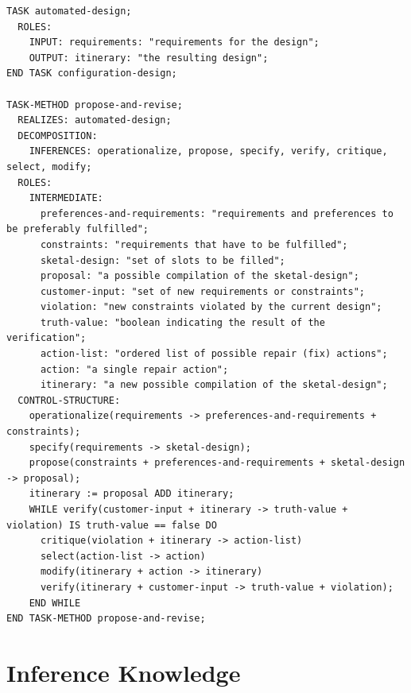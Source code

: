 \documentclass[11pt]{article} %
\begin{document}
\begin{lstlisting}[label=Task,caption=Task and task method description,breaklines=true]
TASK automated-design;
  ROLES:
    INPUT: requirements: "requirements for the design";
    OUTPUT: itinerary: "the resulting design";
END TASK configuration-design;

TASK-METHOD propose-and-revise;
  REALIZES: automated-design;
  DECOMPOSITION:
    INFERENCES: operationalize, propose, specify, verify, critique, select, modify;
  ROLES:
    INTERMEDIATE:
      preferences-and-requirements: "requirements and preferences to be preferably fulfilled";
      constraints: "requirements that have to be fulfilled";
      sketal-design: "set of slots to be filled";
      proposal: "a possible compilation of the sketal-design";
      customer-input: "set of new requirements or constraints";
      violation: "new constraints violated by the current design";
      truth-value: "boolean indicating the result of the verification";
      action-list: "ordered list of possible repair (fix) actions";
      action: "a single repair action";
      itinerary: "a new possible compilation of the sketal-design";
  CONTROL-STRUCTURE:
    operationalize(requirements -> preferences-and-requirements + constraints);
    specify(requirements -> sketal-design);
    propose(constraints + preferences-and-requirements + sketal-design -> proposal);
    itinerary := proposal ADD itinerary;
    WHILE verify(customer-input + itinerary -> truth-value + violation) IS truth-value == false DO
      critique(violation + itinerary -> action-list)
      select(action-list -> action)
      modify(itinerary + action -> itinerary)
      verify(itinerary + customer-input -> truth-value + violation);
    END WHILE
END TASK-METHOD propose-and-revise;
\end{lstlisting}

\clearpage
\section{Inference Knowledge}
\end{document}
